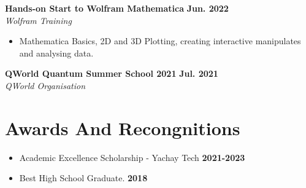 \documentclass[a4paper,12pt]{article}
\begin{document}
\textbf{Hands-on Start to Wolfram Mathematica} \hfill {\textbf{Jun. 2022}}\\
\emph{Wolfram Training}
\begin{itemize}
    \item Mathematica Basics, 2D and 3D Plotting, creating interactive manipulates 
        and analysing data.
\end{itemize}

\textbf{QWorld Quantum Summer School 2021} \hfill {\textbf{Jul. 2021}}\\
\emph{QWorld Organisation}


\section{Awards And Recongnitions}
\begin{itemize}
    \item   Academic Excellence Scholarship - Yachay Tech  \hfill {\textbf{2021-2023}}
    \item Best High School Graduate. \hfill {\textbf{2018}}
\end{itemize}




\begin{comment}
\begin{tabularx}{\linewidth}{ @{}l r@{} }
\textbf{Some Project} & \hfill \href{https://some-link.com}{Link to Demo} \\[3.75pt]
\multicolumn{2}{@{}X@{}}{long long line of blah blah that will wrap when the table fills the column width long long line of blah blah that will wrap when the table fills the column width long long line of blah blah that will wrap when the table fills the column width long long line of blah blah that will wrap when the table fills the column width}  \\
\end{tabularx}
\end{comment}


\begin{comment}
\begin{refsection}[citations.bib]
\nocite{*}
\printbibliography[heading=none]
\end{refsection}
\end{comment}
\end{document}
